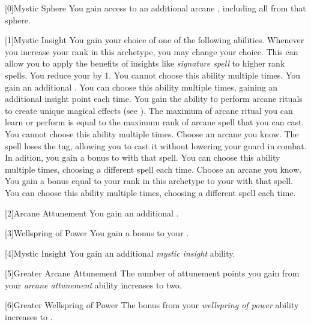         [0]{Mystic Sphere} You gain access to an additional arcane , including all  from that sphere.

        [1]{Mystic Insight}
        You gain your choice of one of the following abilities.
        Whenever you increase your rank in this archetype, you may change your choice.
        This can allow you to apply the benefits of insights like \textit{signature spell} to higher rank spells.
        {
             You reduce your  by 1.
                You cannot choose this ability multiple times.
             You gain an additional .
                You can choose this ability multiple times, gaining an additional insight point each time.
             You gain the ability to perform arcane rituals to create unique magical effects (see ).
                The maximum  of arcane ritual you can learn or perform is equal to the maximum rank of arcane spell that you can cast.
                You cannot choose this ability multiple times.
             Choose an arcane  you know.
                The spell loses the  tag, allowing you to cast it without lowering your guard in combat.
                In adition, you gain a  bonus to  with that spell.
                You can choose this ability multiple times, choosing a different spell each time.
             Choose an arcane  you know.
                You gain a bonus equal to your rank in this archetype to your  with that spell.
                You can choose this ability multiple times, choosing a different spell each time.
        }

        [2]{Arcane Attunement} You gain an additional .

        [3]{Wellspring of Power}
        You gain a  bonus to your  .

        [4]{Mystic Insight}
        You gain an additional \textit{mystic insight} ability.

        [5]{Greater Arcane Attunement} The number of attunement points you gain from your \textit{arcane attunement} ability increases to two.

        [6]{Greater Wellspring of Power}
        The bonus from your \textit{wellspring of power} ability increases to .

